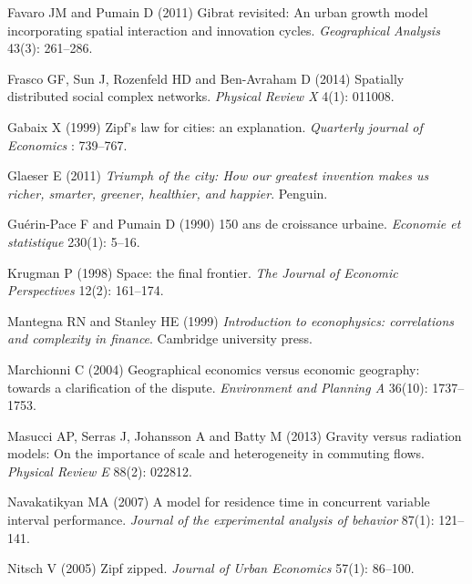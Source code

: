 \documentclass{article}
\begin{document}
\begin{thebibliography}{51}
Favaro JM and Pumain D (2011) Gibrat revisited: An urban growth model
  incorporating spatial interaction and innovation cycles.
\newblock \emph{Geographical Analysis} 43(3): 261--286.

Frasco GF, Sun J, Rozenfeld HD and Ben-Avraham D (2014) Spatially distributed
  social complex networks.
\newblock \emph{Physical Review X} 4(1): 011008.

Gabaix X (1999) Zipf's law for cities: an explanation.
\newblock \emph{Quarterly journal of Economics} : 739--767.

Glaeser E (2011) \emph{Triumph of the city: How our greatest invention makes us
  richer, smarter, greener, healthier, and happier}.
\newblock Penguin.

Gu{\'e}rin-Pace F and Pumain D (1990) 150 ans de croissance urbaine.
\newblock \emph{Economie et statistique} 230(1): 5--16.

Krugman P (1998) Space: the final frontier.
\newblock \emph{The Journal of Economic Perspectives} 12(2): 161--174.

Mantegna RN and Stanley HE (1999) \emph{Introduction to econophysics:
  correlations and complexity in finance}.
\newblock Cambridge university press.

Marchionni C (2004) Geographical economics versus economic geography: towards a
  clarification of the dispute.
\newblock \emph{Environment and Planning A} 36(10): 1737--1753.

Masucci AP, Serras J, Johansson A and Batty M (2013) Gravity versus radiation
  models: On the importance of scale and heterogeneity in commuting flows.
\newblock \emph{Physical Review E} 88(2): 022812.

Navakatikyan MA (2007) A model for residence time in concurrent variable
  interval performance.
\newblock \emph{Journal of the experimental analysis of behavior} 87(1):
  121--141.

Nitsch V (2005) Zipf zipped.
\newblock \emph{Journal of Urban Economics} 57(1): 86--100.


\end{thebibliography}
\end{document}
